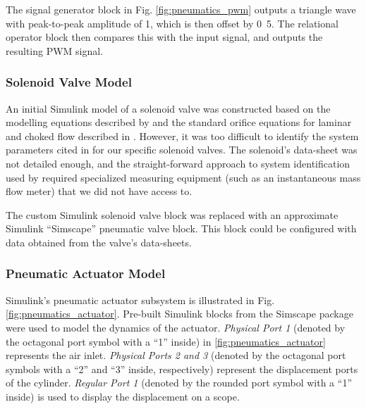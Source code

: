 
The signal generator block in Fig. \ref{fig:pneumatics_pwm} outputs a triangle wave with peak-to-peak amplitude of \unit{1}{\volt}, which is then offset by \unit{0.5}{\volt}. The relational operator block then compares this with the input signal, and outputs the resulting PWM signal.

\subsubsection{Solenoid Valve Model}

An initial Simulink model of a solenoid valve was constructed based on the modelling equations described by \citet{valve_models} and the standard orifice equations for laminar and choked flow described in \cite{fluid_power}. However, it was too difficult to identify the system parameters cited in \cite{fluid_power} for our specific solenoid valves. The solenoid's data-sheet was not detailed enough, and the straight-forward approach to system identification used by \cite{valve_models} required specialized measuring equipment (such as an instantaneous mass flow meter) that we did not have access to.

The custom Simulink solenoid valve block was replaced with an approximate Simulink ``Simscape'' pneumatic valve block. This block could be configured with data obtained from the valve's data-sheets. 

\subsubsection{Pneumatic Actuator Model}

Simulink's pneumatic actuator subsystem is illustrated in Fig. \ref{fig:pneumatics_actuator}. Pre-built Simulink blocks from the Simscape package were used to model the dynamics of the actuator. \emph{Physical Port 1} (denoted by the octagonal port symbol with a ``1'' inside) in \ref{fig:pneumatics_actuator} represents the air inlet. \emph{Physical Ports 2 and 3} (denoted by the octagonal port symbols with a ``2'' and ``3'' inside, respectively) represent the displacement ports of the cylinder. \emph{Regular Port 1} (denoted by the rounded port symbol with a ``1'' inside) is used to display the displacement on a scope.

